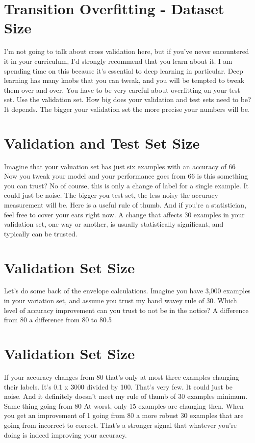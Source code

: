 \documentclass{article}
\begin{document}
\section{Transition Overfitting - Dataset Size}
I'm not going to talk about
cross validation here, but
if you've never encountered
it in your curriculum,
I'd strongly recommend
that you learn about it.
I am spending time on this because
it's essential to deep learning
in particular.
Deep learning has many knobs
that you can tweak, and
you will be tempted to
tweak them over and over.
You have to be very careful about
overfitting on your test set.
Use the validation set.
How big does your validation and
test sets need to be?
It depends.
The bigger your validation set
the more precise your numbers will be.
\section{Validation and Test Set Size}
Imagine that your valuation set has just
six examples with an accuracy of 66%
Now you tweak your model and
your performance goes from 66%
is this something you can trust?
No of course, this is only a change
of label for a single example.
It could just be noise.
The bigger you test set, the less noisy
the accuracy measurement will be.
Here is a useful rule of thumb.
And if you're a statistician,
feel free to cover your ears right now.
A change that affects 30 examples in
your validation set, one way or another,
is usually statistically significant,
and typically can be trusted.
\section{Validation Set Size}
Let's do some back of
the envelope calculations.
Imagine you have 3,000 examples
in your variation set, and
assume you trust my
hand wavey rule of 30.
Which level of accuracy improvement
can you trust to not be in the notice?
A difference from 80%
a difference from 80%
to 80.5%
\section{Validation Set Size}
If your accuracy changes
from 80%
that's only at most three
examples changing their labels.
It's 0.1 x 3000 divided by 100.
That's very few.
It could just be noise.
And it definitely doesn't meet my
rule of thumb of 30 examples minimum.
Same thing going from 80%
At worst,
only 15 examples are changing then.
When you get an improvement of 1%
going from 80%
a more robust 30 examples that
are going from incorrect to correct.
That's a stronger signal that whatever
you're doing is indeed improving your
accuracy.
\end{document}
